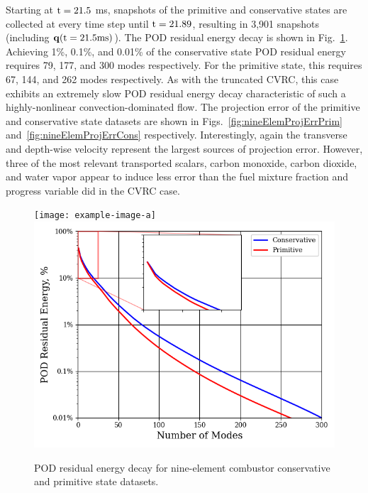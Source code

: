 Starting at $\text{t} = 21.5$ ms, snapshots of the primitive and conservative states are collected at every time step until $\text{t} = 21.89$, resulting in 3,901 snapshots (including $\mathbf{q}(\text{t} = 21.5 \text{ms})$). The POD residual energy decay is shown in Fig.~\ref{fig:nineElemPODEnergy}. Achieving 1\%, 0.1\%, and 0.01\% of the conservative state POD residual energy requires 79, 177, and 300 modes respectively. For the primitive state, this requires 67, 144, and 262 modes respectively. As with the truncated CVRC, this case exhibits an extremely slow POD residual energy decay characteristic of such a highly-nonlinear convection-dominated flow. The projection error of the primitive and conservative state datasets are shown in Figs.~\ref{fig:nineElemProjErrPrim} and~\ref{fig:nineElemProjErrCons} respectively. Interestingly, again the transverse and depth-wise velocity represent the largest sources of projection error. However, three of the most relevant transported scalars, carbon monoxide, carbon dioxide, and water vapor appear to induce less error than the fuel mixture fraction and progress variable did in the CVRC case.

\begin{figure}
	\centering
	\ifdefined\DRAFT
		\texttt{[image: example-image-a]}
	\else
		\includegraphics[width=0.8\linewidth]{Chapters/HPROMResults/Images/nineElem/nineElem_pod_energy.png}
	\fi
	\caption{\label{fig:nineElemPODEnergy}POD residual energy decay for nine-element combustor conservative and primitive state datasets.}
\end{figure}

